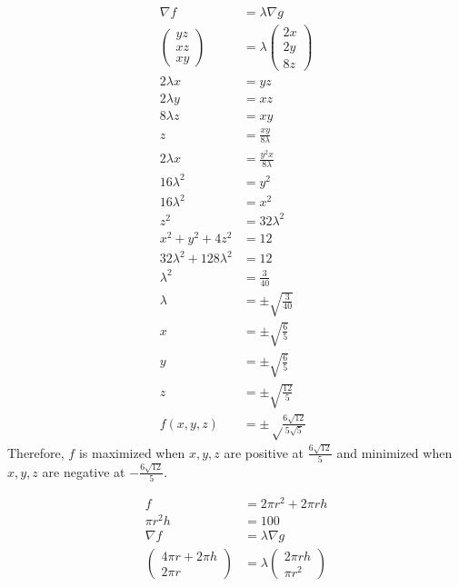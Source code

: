 \documentclass[8pt]{extarticle}
\begin{document}
\begin{problem}{15.3}
\begin{description}[font=\normalfont]
      \item[12:]
        \begin{align*}
          \nabla f &= \lambda \nabla g\\
          \begin{pmatrix}yz\\xz\\xy\end{pmatrix} &= \lambda \begin{pmatrix}2x\\2y\\8z\end{pmatrix}\\
          2\lambda x &= yz\\
          2\lambda y &= xz\\
          8\lambda z &= xy\\
          z &= \frac{xy}{8\lambda}\\
          2\lambda x &= \frac{y^2x}{8\lambda}\\
          16\lambda^2 &= y^2 \tag*{$x\neq 0$}\\
          16\lambda^2 &= x^2 \tag*{$y \neq 0$}\\
          z^2 &= 32\lambda^2\\
          x^2 + y^2 + 4z^2 &= 12\\
          32\lambda^2 + 128\lambda^2 &= 12\\
          \lambda^2 &= \frac{3}{40}\\
          \lambda &= \pm \sqrt{\frac{3}{40}}\\
          x &= \pm \sqrt{\frac{6}{5}}\\
          y &= \pm \sqrt{\frac{6}{5}}\\
          z &= \pm \sqrt{\frac{12}{5}}\\
          f(x,y,z) &= \pm\sqrt\frac{6\sqrt{12}}{5\sqrt{5}}
        \end{align*}
        Therefore, $f$ is maximized when $x,y,z$ are positive at $\frac{6\sqrt{12}}{5}$ and minimized when $x,y,z$ are negative at $-\frac{6\sqrt{12}}{5}$.
      \item[36:]
        \begin{align*}
          f &= 2\pi r^2 + 2\pi r h\\
          \pi r^2 h &= 100\\
          \nabla f &= \lambda \nabla g\\
          \begin{pmatrix}4\pi r + 2\pi h\\2\pi r\end{pmatrix} &= \lambda \begin{pmatrix}2\pi r h \\ \pi r^2\end{pmatrix}\\

\end{align*}
\end{description}
\end{problem}
\end{document}
